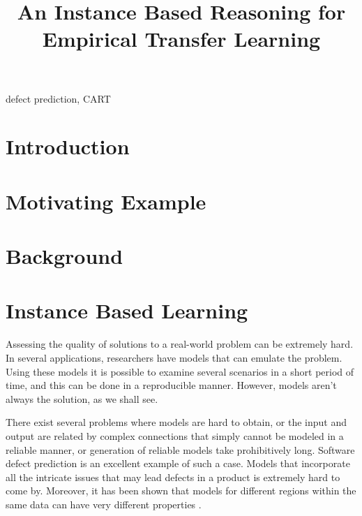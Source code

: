 \documentclass[conference]{IEEEtran}
\begin{document}
  \title{An Instance Based Reasoning for Empirical Transfer Learning}
  
  \author{
    \and
    }
  
  \maketitle
  
  
  \begin{abstract}
 
  \end{abstract}
  \begin{IEEEkeywords}
    defect prediction, CART
  \end{IEEEkeywords}
  
\section{Introduction}
\section{Motivating Example}
\section{Background}
\section{Instance Based Learning}

Assessing the quality of solutions to a real-world problem can be extremely hard. In several applications, researchers have models that can emulate the problem. Using these models it is possible to examine several scenarios in a short period of time, and this can be done in a reproducible manner. However, models aren't always the solution, as we shall see. 

There exist several problems where models are hard to obtain, or the input and output are related by complex connections that simply cannot be modeled in a reliable manner, or generation of reliable models take prohibitively long. Software defect prediction is an excellent example of such a case. Models that incorporate all the intricate issues that may lead defects in a product is extremely hard to come by. Moreover, it has been shown that models for different regions within the same data can have very different properties \cite{localvsglobal}. 
\end{document}
